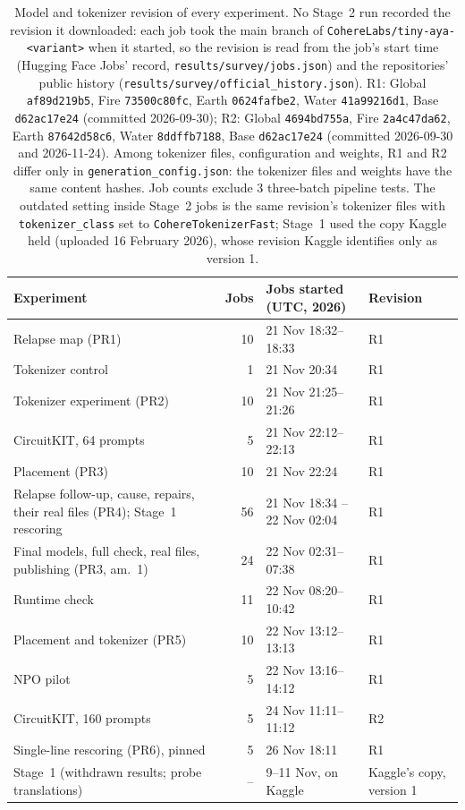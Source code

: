\begin{table}[!t]
\centering\footnotesize
\begin{tabular}{@{}>{\raggedright\arraybackslash}p{} r l >{\raggedright\arraybackslash}p{}@{}}
\toprule
Experiment & Jobs & Jobs started (UTC, 2026) & Revision \\
\midrule
Relapse map (PR1) & 10 & 21 Nov 18:32--18:33 & R1 \\
Tokenizer control & 1 & 21 Nov 20:34 & R1 \\
Tokenizer experiment (PR2) & 10 & 21 Nov 21:25--21:26 & R1 \\
CircuitKIT, 64 prompts & 5 & 21 Nov 22:12--22:13 & R1 \\
Placement (PR3) & 10 & 21 Nov 22:24 & R1 \\
Relapse follow-up, cause, repairs, their real files (PR4); Stage~1 rescoring & 56 & 21 Nov 18:34 -- 22 Nov 02:04 & R1 \\
Final models, full check, real files, publishing (PR3, am.~1) & 24 & 22 Nov 02:31--07:38 & R1 \\
Runtime check & 11 & 22 Nov 08:20--10:42 & R1 \\
Placement and tokenizer (PR5) & 10 & 22 Nov 13:12--13:13 & R1 \\
NPO pilot & 5 & 22 Nov 13:16--14:12 & R1 \\
CircuitKIT, 160 prompts & 5 & 24 Nov 11:11--11:12 & R2 \\
Single-line rescoring (PR6), pinned & 5 & 26 Nov 18:11 & R1 \\
\midrule
Stage~1 (withdrawn results; probe translations) & -- & 9--11 Nov, on Kaggle & Kaggle's copy, version 1 \\
\bottomrule
\end{tabular}
\caption{Model and tokenizer revision of every experiment. No Stage~2 run recorded the revision it downloaded: each job took the main branch of \texttt{CohereLabs/tiny-aya-<variant>} when it started, so the revision is read from the job's start time (Hugging Face Jobs' record, \texttt{results/survey/jobs.json}) and the repositories' public history (\texttt{results/survey/official\_history.json}). R1: Global \texttt{af89d219b5}, Fire \texttt{73500c80fc}, Earth \texttt{0624fafbe2}, Water \texttt{41a99216d1}, Base \texttt{d62ac17e24} (committed 2026-09-30); R2: Global \texttt{4694bd755a}, Fire \texttt{2a4c47da62}, Earth \texttt{87642d58c6}, Water \texttt{8ddffb7188}, Base \texttt{d62ac17e24} (committed 2026-09-30 and 2026-11-24). Among tokenizer files, configuration and weights, R1 and R2 differ only in \texttt{generation\_config.json}: the tokenizer files and weights have the same content hashes. Job counts exclude 3 three-batch pipeline tests. The outdated setting inside Stage~2 jobs is the same revision's tokenizer files with \texttt{tokenizer\_class} set to \texttt{CohereTokenizerFast}; Stage~1 used the copy Kaggle held (uploaded 16 February 2026), whose revision Kaggle identifies only as version 1.}
\label{tab:revisions}
\end{table}
